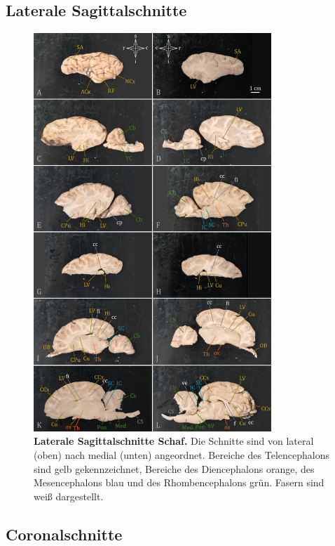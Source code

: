 \documentclass[12pt,a4paper,pdftex]{article}
\begin{document}
\newpage
\subsection{Laterale Sagittalschnitte}
\label{subsec:lateral_sagittal}

\begin{figure}[H]
    \centering
    \includegraphics[width=0.8\textwidth]{pictures/Bilder_Jule/Schaf/lateral_sagittal/schaf_lateral_sagittal.png}
    \caption[Laterale Sagittalschnitte Schaf]{\textbf{Laterale Sagittalschnitte Schaf.} Die Schnitte sind von lateral (oben) nach medial (unten) angeordnet. Bereiche des Telencephalons sind gelb gekennzeichnet, Bereiche des Diencephalons orange, des Mesencephalons blau und des Rhombencephalons grün. Fasern sind weiß dargestellt.}
    \label{fig:schaf_lateral_sagittal}
\end{figure}


\newpage
\subsection{Coronalschnitte}
\label{subsec:coronal}
\end{document}
